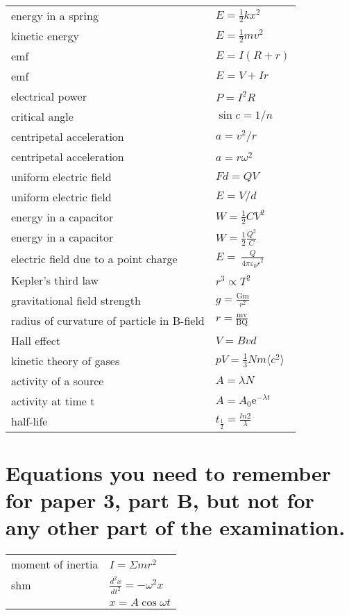 \documentclass[main.tex]{subfiles}
\begin{document}
\renewcommand*{\arraystretch}{2}
\begin{longtable}{ll}
energy in a spring & $E = \frac{1}{2}kx^2$ \\
kinetic energy & $E = \frac{1}{2}mv^{2}$\\
emf & $E = I(R+r)$\\
emf & $E = V + Ir$\\
electrical power & $P = I^{2}R$\\
critical angle & $\sin{c} = 1/n$\\
centripetal acceleration & $a = v^{2}/r$\\
centripetal acceleration & $a = r\omega^2$\\
uniform electric field & $Fd = QV$\\
uniform electric field & $E = V/d$\\
energy in a capacitor & $W = \frac{1}{2}CV^2$\\
energy in a capacitor & $W = \frac{1}{2}\frac{Q^2}{C}$\\
electric field due to a point charge &
\(E = \ \frac{Q}{{4\pi\varepsilon_{0}r}^{2}}\)\\

Kepler's third law & $r^{3} \propto T^{2}$\\
gravitational field strength & \(g = \frac{\text{Gm}}{r^{2}}\)\\

radius of curvature of particle in B-field &
\(r = \frac{\text{mv}}{\text{BQ}}\) \\

Hall effect & $V = Bvd$\\

kinetic theory of gases & $pV = \frac{1}{3}Nm\langle c^2 \rangle$\\

activity of a source & $A = \lambda N$\\

activity at time t & $A = A_0\text{e}^{-\lambda t}$\\
half-life & \(t_{\frac{1}{2}} = \frac{ln2}{\lambda}\)\\
\end{longtable}
\section{Equations you need to remember for paper 3, part B, but not for any other part of the examination.}
\renewcommand*{\arraystretch}{2}
\begin{longtable}{ll}
moment of inertia & \(I = \Sigma mr^{2}\)\\
shm & \(\frac{d^{2}x}{dt^{2}} = - \omega^{2}x\)\\
& $x = A\cos{\omega t}$\\
\end{longtable}
\end{document}
